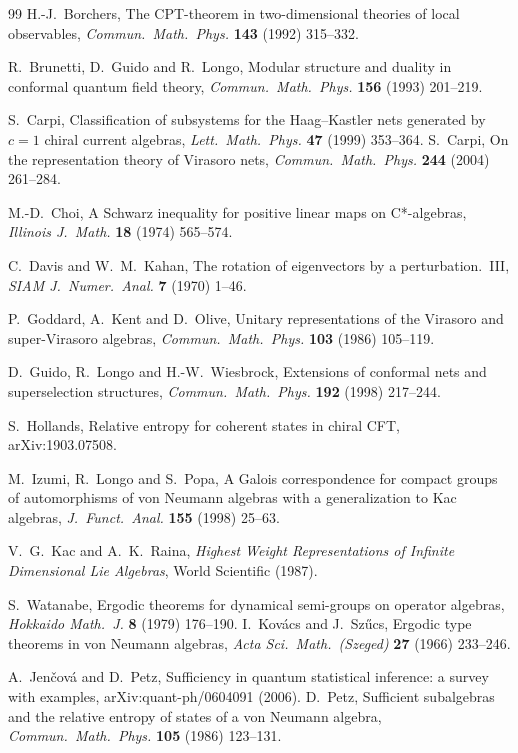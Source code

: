 \documentclass[12pt]{article}
\theoremstyle{definition}
\theoremstyle{remark}
\begin{document}
\begin{thebibliography}{99}
H.-J.~Borchers, The CPT-theorem in two-dimensional theories of local observables,
\emph{Commun.\ Math.\ Phys.} \textbf{143} (1992) 315--332.

R.~Brunetti, D.~Guido and R.~Longo, Modular structure and duality in conformal quantum
field theory, \emph{Commun.\ Math.\ Phys.} \textbf{156} (1993) 201--219.

S.~Carpi, Classification of subsystems for the Haag--Kastler nets generated by \(c=1\) chiral current algebras, \emph{Lett.\ Math.\ Phys.} \textbf{47} (1999) 353--364.
S.~Carpi, On the representation theory of Virasoro nets, \emph{Commun.\ Math.\ Phys.}
\textbf{244} (2004) 261--284.

M.-D.~Choi, A Schwarz inequality for positive linear maps on C*-algebras,
\emph{Illinois J.\ Math.} \textbf{18} (1974) 565--574.

C.~Davis and W.~M.~Kahan, The rotation of eigenvectors by a perturbation.~III,
\emph{SIAM J.\ Numer.\ Anal.} \textbf{7} (1970) 1--46.

P.~Goddard, A.~Kent and D.~Olive, Unitary representations of the Virasoro and
super-Virasoro algebras, \emph{Commun.\ Math.\ Phys.} \textbf{103} (1986) 105--119.

D.~Guido, R.~Longo and H.-W.~Wiesbrock, Extensions of conformal nets and superselection
structures, \emph{Commun.\ Math.\ Phys.} \textbf{192} (1998) 217--244.

S.~Hollands, Relative entropy for coherent states in chiral CFT, arXiv:1903.07508.

M.~Izumi, R.~Longo and S.~Popa, A Galois correspondence for compact groups of
automorphisms of von Neumann algebras with a generalization to Kac algebras,
\emph{J.\ Funct.\ Anal.} \textbf{155} (1998) 25--63.

V.~G.~Kac and A.~K.~Raina, \emph{Highest Weight Representations of Infinite Dimensional
Lie Algebras}, World Scientific (1987).

S.~Watanabe, Ergodic theorems for dynamical semi-groups on operator algebras, \emph{Hokkaido Math.\ J.} \textbf{8} (1979) 176--190.
I.~Kov\'acs and J.~Sz\H{u}cs, Ergodic type theorems in von Neumann algebras, \emph{Acta
Sci.\ Math.\ (Szeged)} \textbf{27} (1966) 233--246.

A.~Jen\v{c}ov\'a and D.~Petz, Sufficiency in quantum statistical inference: a survey with examples, arXiv:quant-ph/0604091 (2006).
D.~Petz, Sufficient subalgebras and the relative entropy of states of a von Neumann
algebra, \emph{Commun.\ Math.\ Phys.} \textbf{105} (1986) 123--131.


\end{thebibliography}
\end{document}
